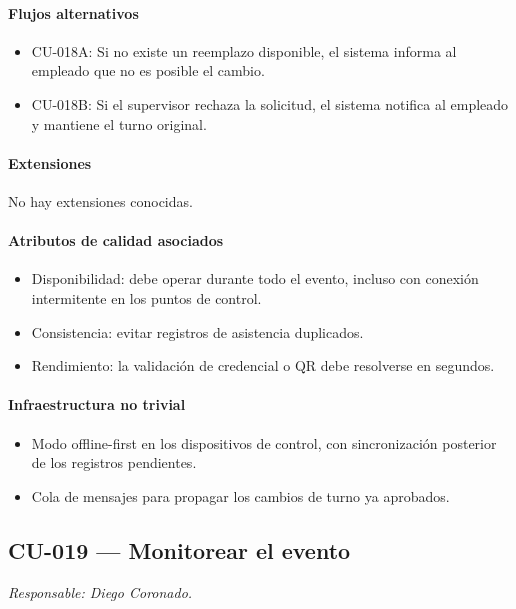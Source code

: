 \paragraph{Flujos alternativos}
\begin{itemize}[leftmargin=1.4em, topsep=1pt]
  \item CU-018A: Si no existe un reemplazo disponible, el sistema informa al empleado que no es posible el cambio.
  \item CU-018B: Si el supervisor rechaza la solicitud, el sistema notifica al empleado y mantiene el turno original.
\end{itemize}

\paragraph{Extensiones}
No hay extensiones conocidas.

\paragraph{Atributos de calidad asociados}
\begin{itemize}[leftmargin=1.4em, topsep=1pt]
  \item Disponibilidad: debe operar durante todo el evento, incluso con conexión intermitente en los puntos de control.
  \item Consistencia: evitar registros de asistencia duplicados.
  \item Rendimiento: la validación de credencial o QR debe resolverse en segundos.
\end{itemize}

\paragraph{Infraestructura no trivial}
\begin{itemize}[leftmargin=1.4em, topsep=1pt]
  \item Modo offline-first en los dispositivos de control, con sincronización posterior de los registros pendientes.
  \item Cola de mensajes para propagar los cambios de turno ya aprobados.
\end{itemize}

\subsection{CU-019 --- Monitorear el evento}
\label{cu:cu-019}
\textit{Responsable: Diego Coronado.}


